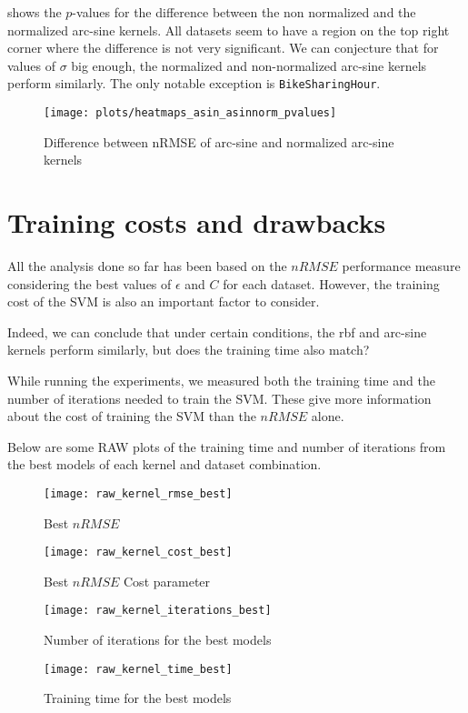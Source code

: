  shows the $p$-values for the difference between
the non normalized and the normalized arc-sine kernels. All datasets seem to have
a region on the top right corner where the difference is not very significant.
We can conjecture that for values of $\sigma$ big enough, the normalized and
non-normalized arc-sine kernels perform similarly. The only notable exception is
\texttt{BikeSharingHour}.

\begin{figure}[H]
    \texttt{[image: plots/heatmaps\_asin\_asinnorm\_pvalues]}
    \caption{Difference between nRMSE of arc-sine and normalized arc-sine kernels}
    \label{fig:heatmaps-asin-asinnorm}
\end{figure}

\section{Training costs and drawbacks}

All the analysis done so far has been based on the $nRMSE$ performance measure
considering the best values of $\epsilon$ and $C$ for each dataset. However,
the training cost of the SVM is also an important factor to consider.

Indeed, we can conclude that under certain conditions, the rbf and arc-sine
kernels perform similarly, but does the training time also match?

While running the experiments, we measured both the training time and the
number of iterations needed to train the SVM. These give more information
about the cost of training the SVM than the $nRMSE$ alone.

\begin{cnote}
    Below are some RAW plots of the training time and number of iterations
    from the best models of each kernel and dataset combination.
\end{cnote}
\begin{figure}[H]
    \texttt{[image: raw\_kernel\_rmse\_best]}
    \caption{Best $nRMSE$}
\end{figure}
\begin{figure}[H]
    \texttt{[image: raw\_kernel\_cost\_best]}
    \caption{Best $nRMSE$ Cost parameter}
\end{figure}
\begin{figure}[H]
    \texttt{[image: raw\_kernel\_iterations\_best]}
    \caption{Number of iterations for the best models}
\end{figure}
\begin{figure}[H]
    \texttt{[image: raw\_kernel\_time\_best]}
    \caption{Training time for the best models}
\end{figure}


